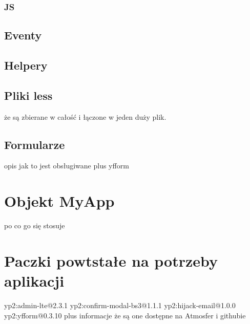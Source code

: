     \subsubsection{JS}
  \subsection{Eventy}
  \subsection{Helpery}
  \subsection{Pliki less}
    że są zbierane w całość i łączone w jeden duży plik.
  \subsection{Formularze}
    opis jak to jest obsługiwane plus yfform
  
\section{Objekt MyApp}
  po co go się stosuje

  
\section{Paczki powtstałe na potrzeby aplikacji}
yp2:admin-lte@2.3.1
yp2:confirm-modal-bs3@1.1.1
yp2:hijack-email@1.0.0
yp2:yfform@0.3.10
plus informacje że są one dostępne na Atmosfer i githubie